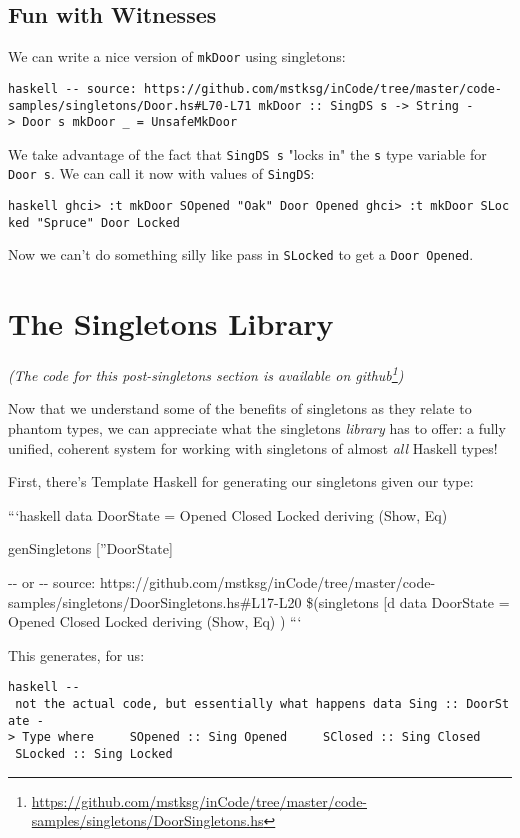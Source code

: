 \documentclass[]{article}
\renewcommand{\href}[2]{#2\footnote{\url{#1}}}
\begin{document}
\subsection{Fun with Witnesses}

We can write a nice version of \texttt{mkDoor} using singletons:

\texttt{haskell\ -\/-\ source:\ https://github.com/mstksg/inCode/tree/master/code-samples/singletons/Door.hs\#L70-L71\ mkDoor\ ::\ SingDS\ s\ -\textgreater{}\ String\ -\textgreater{}\ Door\ s\ mkDoor\ \_\ =\ UnsafeMkDoor}

We take advantage of the fact that \texttt{SingDS\ s} "locks in" the \texttt{s}
type variable for \texttt{Door\ s}. We can call it now with values of
\texttt{SingDS}:

\texttt{haskell\ ghci\textgreater{}\ :t\ mkDoor\ SOpened\ "Oak"\ Door\ \textquotesingle{}Opened\ ghci\textgreater{}\ :t\ mkDoor\ SLocked\ "Spruce"\ Door\ \textquotesingle{}Locked}

Now we can't do something silly like pass in \texttt{SLocked} to get a
\texttt{Door\ \textquotesingle{}Opened}.

\section{The Singletons Library}

\emph{(The code for this post-singletons section is available
\href{https://github.com/mstksg/inCode/tree/master/code-samples/singletons/DoorSingletons.hs}{on
github})}

Now that we understand some of the benefits of singletons as they relate to
phantom types, we can appreciate what the singletons \emph{library} has to
offer: a fully unified, coherent system for working with singletons of almost
\emph{all} Haskell types!

First, there's Template Haskell for generating our singletons given our type:

```haskell data DoorState = Opened \textbar{} Closed \textbar{} Locked deriving
(Show, Eq)

genSingletons {[}''DoorState{]}

-\/- or -\/- source:
https://github.com/mstksg/inCode/tree/master/code-samples/singletons/DoorSingletons.hs\#L17-L20
\$(singletons {[}d\textbar{} data DoorState = Opened \textbar{} Closed
\textbar{} Locked deriving (Show, Eq) \textbar{}{]}) ```

This generates, for us:

\texttt{haskell\ -\/-\ not\ the\ actual\ code,\ but\ essentially\ what\ happens\ data\ Sing\ ::\ DoorState\ -\textgreater{}\ Type\ where\ \ \ \ \ SOpened\ ::\ Sing\ \textquotesingle{}Opened\ \ \ \ \ SClosed\ ::\ Sing\ \textquotesingle{}Closed\ \ \ \ \ SLocked\ ::\ Sing\ \textquotesingle{}Locked}
\end{document}
